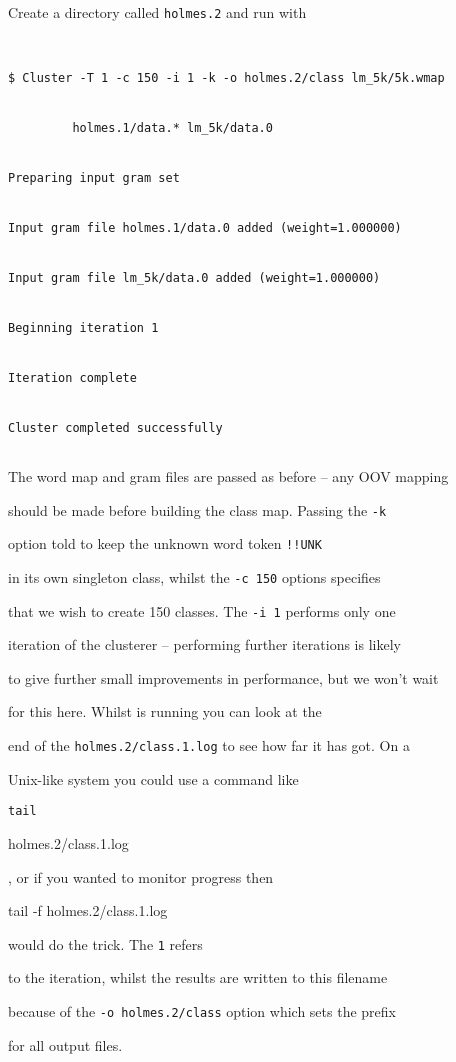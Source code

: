 Create a directory called {\tt holmes.2} and run  with


\begin{verbatim}


$ Cluster -T 1 -c 150 -i 1 -k -o holmes.2/class lm_5k/5k.wmap


         holmes.1/data.* lm_5k/data.0


Preparing input gram set


Input gram file holmes.1/data.0 added (weight=1.000000)


Input gram file lm_5k/data.0 added (weight=1.000000)


Beginning iteration 1


Iteration complete


Cluster completed successfully


\end{verbatim} %


The word map and gram files are passed as before -- any OOV mapping


should be made before building the class map.  Passing the {\tt -k}


option told  to keep the unknown word token {\tt !!UNK}


in its own singleton class, whilst the {\tt -c 150} options specifies


that we wish to create 150 classes.  The {\tt -i 1} performs only one


iteration of the clusterer -- performing further iterations is likely


to give further small improvements in performance, but we won't wait


for this here.  Whilst  is running you can look at the


end of the {\tt holmes.2/class.1.log} to see how far it has got.  On a


Unix-like system you could use a command like {\tt tail


holmes.2/class.1.log}, or if you wanted to monitor progress then {\tt


tail -f holmes.2/class.1.log} would do the trick.  The {\tt 1} refers


to the iteration, whilst the results are written to this filename


because of the {\tt -o holmes.2/class} option which sets the prefix


for all output files.





